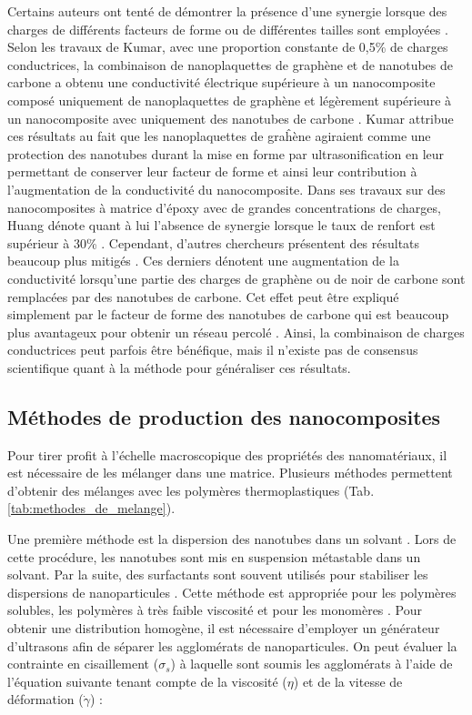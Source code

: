 Certains auteurs ont tenté de démontrer la présence d'une synergie lorsque des charges de différents facteurs de forme ou de différentes tailles sont employées \cite{Kumar2010,Huang2012a,Dweiri2015,Wei2010,Safdari2012}.
Selon les travaux de Kumar, avec une proportion constante de 0,5\% de charges conductrices, la combinaison de nanoplaquettes de graphène et de nanotubes de carbone a obtenu une conductivité électrique supérieure à un nanocomposite composé uniquement de nanoplaquettes de graphène et légèrement supérieure à un nanocomposite avec uniquement des nanotubes de carbone \cite{Kumar2010}. 
Kumar attribue ces résultats au fait que les nanoplaquettes de graĥène agiraient comme une protection des nanotubes durant la mise en forme par ultrasonification en leur permettant de conserver leur facteur de forme et ainsi leur contribution à l'augmentation de la conductivité du nanocomposite. 
Dans ses travaux sur des nanocomposites à matrice d'époxy avec de grandes concentrations de charges, Huang dénote quant à lui l'absence de synergie lorsque le taux de renfort est supérieur à 30\% \cite{Huang2012a}. 
Cependant, d'autres chercheurs présentent des résultats beaucoup plus mitigés \cite{Dweiri2015,Wei2010}. 
Ces derniers dénotent une augmentation de la conductivité lorsqu'une partie des charges de graphène ou de noir de carbone sont remplacées par des nanotubes de carbone. 
Cet effet peut être expliqué simplement par le facteur de forme des nanotubes de carbone qui est beaucoup plus avantageux pour obtenir un réseau percolé \cite{Safdari2012}. 
Ainsi, la combinaison de charges conductrices peut parfois être bénéfique, mais il n'existe pas de consensus scientifique quant à la méthode pour généraliser ces résultats. 

\subsection{Méthodes de production des nanocomposites}

Pour tirer profit à l'échelle macroscopique des propriétés des nanomatériaux, il est nécessaire de les mélanger dans une matrice. 
Plusieurs méthodes permettent d'obtenir des mélanges avec les polymères thermoplastiques (Tab. \ref{tab:methodes_de_melange}). 

Une première méthode est la dispersion des nanotubes dans un solvant \cite{Mohammad2006}.
Lors de cette procédure, les nanotubes sont mis en suspension métastable dans un solvant. 
Par la suite, des surfactants sont souvent utilisés pour stabiliser les dispersions de nanoparticules \cite{Huang2012}. 
Cette méthode est appropriée pour les polymères solubles, les polymères à très faible viscosité et pour les monomères \cite{Ma2010}. 
Pour obtenir une distribution homogène, il est nécessaire d'employer un générateur d'ultrasons afin de séparer les agglomérats de nanoparticules. 
On peut évaluer la contrainte en cisaillement ($\sigma_s$) à laquelle sont soumis les agglomérats à l'aide de l'équation suivante tenant compte de la viscosité ($\eta$) et de la vitesse de déformation ($\dot{\gamma}$) : 

